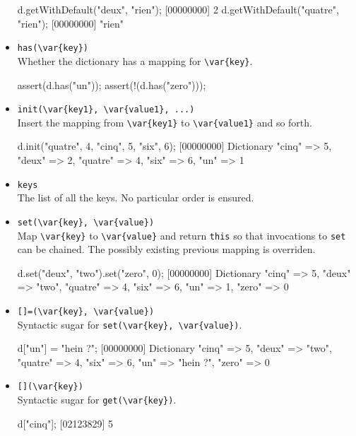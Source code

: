 \begin{itemize}
\begin{urbiscript}[firstnumber=last]
d.getWithDefault("deux", "rien");
[00000000] 2
d.getWithDefault("quatre", "rien");
[00000000] "rien"
\end{urbiscript}


\item \lstinline|has(\var{key})|\\
  Whether the dictionary has a mapping for \lstinline|\var{key}|.

\begin{urbiscript}[firstnumber=last]
assert(d.has("un"));
assert(!(d.has("zero")));
\end{urbiscript}

\item \lstinline|init(\var{key1}, \var{value1}, ...)|~\\
  Insert the mapping from \lstinline|\var{key1}| to
  \lstinline|\var{value1}| and so forth.

\begin{urbiscript}[firstnumber=last]
d.init("quatre", 4, "cinq", 5, "six", 6);
[00000000] Dictionary {"cinq" => 5, "deux" => 2, "quatre" => 4, "six" => 6, "un" => 1}
\end{urbiscript}

\item \lstinline|keys|\\
  The list of all the keys.  No particular order is ensured.

\item \lstinline|set(\var{key}, \var{value})|\\
  Map \lstinline|\var{key}| to \lstinline|\var{value}| and return
  \lstinline|this| so that invocations to \lstinline|set| can be
  chained.  The possibly existing previous mapping is overriden.

\begin{urbiscript}[firstnumber=last]
d.set("deux", "two").set("zero", 0);
[00000000] Dictionary {"cinq" => 5, "deux" => "two", "quatre" => 4, "six" => 6, "un" => 1, "zero" => 0}
\end{urbiscript}

\item \lstinline|[]=(\var{key}, \var{value})|\\
  Syntactic sugar for \lstinline|set(\var{key}, \var{value})|.

\begin{urbiscript}[firstnumber=last]
d["un"] = "hein ?";
[00000000] Dictionary {"cinq" => 5, "deux" => "two", "quatre" => 4, "six" => 6, "un" => "hein ?", "zero" => 0}
\end{urbiscript}

\item \lstinline|[](\var{key})|\\
  Syntactic sugar for \lstinline|get(\var{key})|.

\begin{urbiscript}[firstnumber=last]
d["cinq"];
[02123829] 5
\end{urbiscript}

\end{itemize}

